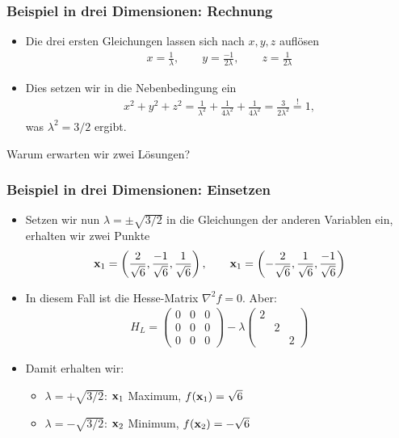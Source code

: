 \begin{frame}
  \frametitle<presentation>{Beispiel in drei Dimensionen: Rechnung}
  \begin{itemize}
  \item Die drei ersten Gleichungen lassen sich nach $x,y,z$ auflösen
    \begin{gather*}
      x = \frac1\lambda,\qquad y = \frac{-1}{2\lambda},\qquad
      z=\frac1{2\lambda}
    \end{gather*}
  \item Dies setzen wir in die Nebenbedingung ein
    \begin{gather*}
      x^2+y^2+z^2 = \frac1{\lambda^2}+\frac1{4\lambda^2}+\frac1{4\lambda^2}
      = \frac3{2\lambda^2}
      \stackrel!= 1,
    \end{gather*}
    was $\lambda^2=3/2$ ergibt.
  \end{itemize}
  \pause
  \begin{Denkpause}
    Warum erwarten wir zwei Lösungen?
  \end{Denkpause}
\end{frame}

\begin{frame}
  \frametitle<presentation>{Beispiel in drei Dimensionen: Einsetzen}
  \begin{itemize}
  \item Setzen wir nun $\lambda = \pm \sqrt{3/2}$ in die Gleichungen der
    anderen Variablen ein, erhalten wir zwei Punkte
    \begin{gather*}
      \mathbf{x}_1 = \left(\frac2{\sqrt{6}},\frac{-1}{\sqrt6},\frac{1}{\sqrt6}\right),
      \qquad
      \mathbf{x}_1 = \left(-\frac2{\sqrt{6}},\frac{1}{\sqrt6},\frac{-1}{\sqrt6}\right)
    \end{gather*}
  \item In diesem Fall ist die Hesse-Matrix $\nabla^2f=0$. Aber:
    \begin{gather*}
      H_L =
      \begin{pmatrix}
        0 & 0 & 0\\
        0 & 0 & 0\\
        0 & 0 & 0
      \end{pmatrix}
      -\lambda
      \begin{pmatrix}
        2 &&\\&2&\\&&2
      \end{pmatrix}
    \end{gather*}
  \item Damit erhalten wir:
    \begin{itemize}
    \item $\lambda = +\sqrt{3/2}$: $\mathbf{x}_1$ Maximum, $f(\mathbf{x}_1) = \sqrt6$
    \item $\lambda = -\sqrt{3/2}$: $\mathbf{x}_2$ Minimum, $f(\mathbf{x}_2) = -\sqrt6$
    \end{itemize}
  \end{itemize}
\end{frame}

